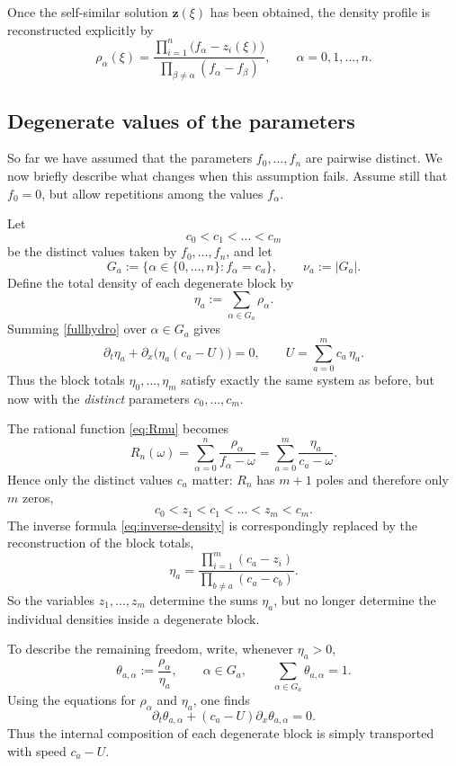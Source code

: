 \documentclass[12pt]{article}
\begin{document}
Once the self-similar solution $\mathbf{z}(\xi)$ has been obtained, the density profile is reconstructed explicitly by
\begin{equation}
\rho_\alpha(\xi)
=
\frac{\prod_{i=1}^n \bigl(f_\alpha-z_i(\xi)\bigr)}{\prod_{\beta\ne\alpha}(f_\alpha-f_\beta)},
\qquad \alpha=0,1,\dots,n.
\label{eq:rho-reconstruction}
\end{equation}

\subsection{Degenerate values of the parameters}

So far we have assumed that the parameters $f_0,\dots,f_n$ are pairwise
distinct. We now briefly describe what changes when this assumption fails.
Assume still that $f_0=0$, but allow repetitions among the values
$f_\alpha$.

Let
\[
c_0<c_1<\dots<c_m
\]
be the distinct values taken by $f_0,\dots,f_n$, and let
\[
G_a:=\{\alpha\in\{0,\dots,n\}: f_\alpha=c_a\},
\qquad
\nu_a:=|G_a|.
\]
Define the total density of each degenerate block by
\[
\eta_a:=\sum_{\alpha\in G_a}\rho_\alpha.
\]
Summing \eqref{fullhydro} over $\alpha\in G_a$ gives
\[
\partial_t \eta_a+\partial_x\bigl(\eta_a(c_a-U)\bigr)=0,
\qquad
U=\sum_{a=0}^m c_a\,\eta_a.
\]
Thus the block totals $\eta_0,\dots,\eta_m$ satisfy exactly the same
system as before, but now with the \emph{distinct} parameters
$c_0,\dots,c_m$.

The rational function \eqref{eq:Rmu} becomes
\[
R_n(\omega)
=
\sum_{\alpha=0}^n \frac{\rho_\alpha}{f_\alpha-\omega}
=
\sum_{a=0}^m \frac{\eta_a}{c_a-\omega}.
\]
Hence only the distinct values $c_a$ matter: $R_n$ has $m+1$ poles and
therefore only $m$ zeros,
\[
c_0<z_1<c_1<\dots<z_m<c_m.
\]
The inverse formula \eqref{eq:inverse-density} is correspondingly replaced
by the reconstruction of the block totals,
\[
\eta_a
=
\frac{\prod_{i=1}^m (c_a-z_i)}
{\prod_{b\neq a}(c_a-c_b)}.
\]
So the variables $z_1,\dots,z_m$ determine the sums $\eta_a$, but no
longer determine the individual densities inside a degenerate block.

To describe the remaining freedom, write, whenever $\eta_a>0$,
\[
\theta_{a,\alpha}:=\frac{\rho_\alpha}{\eta_a},
\qquad \alpha\in G_a,
\qquad
\sum_{\alpha\in G_a}\theta_{a,\alpha}=1.
\]
Using the equations for $\rho_\alpha$ and $\eta_a$, one finds
\[
\partial_t \theta_{a,\alpha}+(c_a-U)\partial_x\theta_{a,\alpha}=0.
\]
Thus the internal composition of each degenerate block is simply
transported with speed $c_a-U$.
\end{document}

